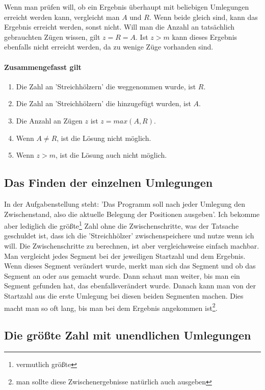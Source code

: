 \documentclass[a4paper,10pt,ngerman]{scrartcl}
\begin{document}
Wenn man prüfen will, ob ein Ergebnis überhaupt mit beliebigen Umlegungen erreicht werden kann, vergleicht man $A$ und $R$. Wenn beide gleich sind, kann das Ergebnis erreicht werden, sonst nicht. Will man die Anzahl an tatsächlich gebrauchten Zügen wissen, gilt $z = R = A$. Ist $z > m$ kann dieses Ergebnis ebenfalls nicht erreicht werden, da zu wenige Züge vorhanden sind.

\paragraph{Zusammengefasst gilt}

\begin{enumerate}
  \item Die Zahl an 'Streichhölzern' die weggenommen wurde, ist $R$.
  \item Die Zahl an 'Streichhölzern' die hinzugefügt wurden, ist $A$.
  \item Die Anzahl an Zügen $z$ ist $z = max(A, R)$.
  \item Wenn $A \neq R$, ist die Lösung nicht möglich.
  \item Wenn $z > m$, ist die Lösung auch nicht möglich.
\end{enumerate}

\subsection{Das Finden der einzelnen Umlegungen}

In der Aufgabenstellung steht: 'Das Programm soll nach jeder Umlegung den Zwischenstand, also die aktuelle Belegung
der Positionen ausgeben'. Ich bekomme aber lediglich die größte\footnote{vermutlich größte} Zahl ohne die Zwischenschritte, was der Tatsache geschuldet ist, dass ich die 'Streichhölzer' zwischenspeichere und nutze wenn ich will. Die Zwischenschritte zu berechnen, ist aber vergleichsweise einfach machbar. Man vergleicht jedes Segment bei der jeweiligen Startzahl und dem Ergebnis. Wenn dieses Segment verändert wurde, merkt man sich das Segment und ob das Segment an oder aus gemacht wurde. Dann schaut man weiter, bis man ein Segment gefunden hat, das ebenfallsverändert wurde. Danach kann man von der Startzahl aus die erste Umlegung bei diesen beiden Segmenten machen. Dies macht man so oft lang, bis man bei dem Ergebnis angekommen ist\footnote{man sollte diese Zwischenergebnisse natürlich auch ausgeben}.

\subsection{Die größte Zahl mit unendlichen Umlegungen}  
\end{document}
